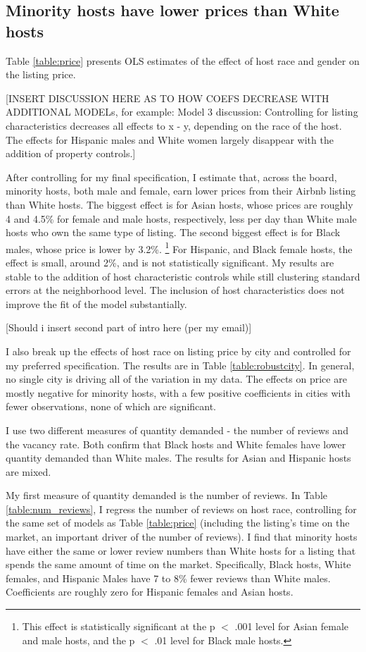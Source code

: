 \subsection*{Minority hosts have lower prices than White hosts} 
	\label{result1}
	

Table \ref{table:price} presents OLS estimates of the effect of host race and gender on the listing price. 

[INSERT DISCUSSION HERE AS TO HOW COEFS DECREASE WITH ADDITIONAL MODELs, for example: Model 3 discussion: Controlling for listing characteristics decreases all effects to x - y, depending on the race of the host. The effects for Hispanic males and White women largely disappear with the addition of property controls.]

After controlling for my final specification, I estimate that, across the board, minority hosts, both male and female, earn lower prices from their Airbnb listing than White hosts. The biggest effect is for Asian hosts, whose prices are roughly 4 and 4.5\% for female and male hosts, respectively, less per day than White male hosts who own the same type of listing. The second biggest effect is for Black males, whose price is lower by 3.2\%.%
	\footnote{This effect is statistically significant at the p $<$ .001 level for Asian female and male hosts, and the p $<$ .01 level for Black male hosts.} 
For Hispanic, and Black female hosts, the effect is small, around 2\%, and is not statistically significant. My results are stable to the addition of host characteristic controls while still clustering standard errors at the neighborhood level. The inclusion of host characteristics does not improve the fit of the model substantially.  

[Should i insert second part of intro here (per my email)]

I also break up the effects of host race on listing price by city and controlled for my preferred specification. The results are in Table \ref{table:robustcity}. In general, no single city is driving all of the variation in my data. The effects on price are mostly negative for minority hosts, with a few positive coefficients in cities with fewer observations, none of which are significant. 

I use two different measures of quantity demanded - the number of reviews and the vacancy rate. Both confirm that Black hosts and White females have lower quantity demanded than White males. The results for Asian and Hispanic hosts are mixed. 

My first measure of quantity demanded is the number of reviews. In Table \ref{table:num_reviews}, I regress the number of reviews on host race, controlling for the same set of models as Table \ref{table:price} (including the listing's time on the market, an important driver of the number of reviews). I find that minority hosts have either the same or lower review numbers than White hosts for a listing that spends the same amount of time on the market. Specifically, Black hosts, White females, and Hispanic Males have 7 to 8\% fewer reviews than White males. Coefficients are roughly zero for Hispanic females and Asian hosts. 

